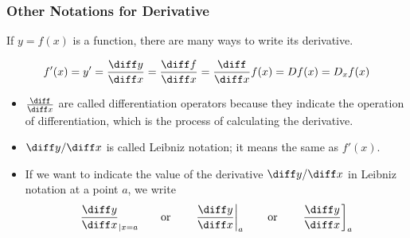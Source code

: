 \begin{frame}
\frametitle{Other Notations for Derivative}
If $y = f(x)$ is a function, there are many ways to write its derivative.

\[
f'(x) = y' = \frac{\diff y}{\diff x} = \frac{\diff f}{\diff x} = \frac{\diff}{\diff x} f(x) = Df(x) = D_x f(x)
\]
\begin{itemize}
\item  $\frac{\diff}{\diff x}$ are called differentiation operators because they indicate the operation of differentiation, which is the process of calculating the derivative.

\item  $\diff y/\diff x$ is called Leibniz notation; it means the same as $f'(x)$.  

\item  If we want to indicate the value of the derivative $\diff y/\diff x$ in Leibniz notation at a point $a$, we write
\[
\frac{\diff y}{\diff x}_{|x=a} \qquad \text{or} \qquad
\left. \frac{\diff y}{\diff x}\right|_a \qquad \text{or}\qquad \left. \frac{\diff y}{\diff x}\right]_a
\]
\end{itemize}
\end{frame}
